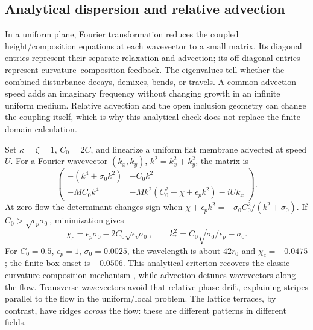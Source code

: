 \subsection{Analytical dispersion and relative advection}


In a uniform plane, Fourier transformation reduces the coupled height/composition equations at each wavevector to a small matrix. Its diagonal entries represent their separate relaxation and advection; its off-diagonal entries represent curvature--composition feedback. The eigenvalues tell whether the combined disturbance decays, demixes, bends, or travels. A common advection speed adds an imaginary frequency without changing growth in an infinite uniform medium. Relative advection and the open inclusion geometry can change the coupling itself, which is why this analytical check does not replace the finite-domain calculation.


Set $\kappa=\zeta=1$, $C_0=2C$, and linearize a uniform flat membrane advected at speed $U$. For a Fourier wavevector $(k_x,k_y)$, $k^2=k_x^2+k_y^2$, the matrix is
\begin{equation}
\begin{pmatrix}
-(k^4+\sigma_0k^2)&-C_0k^2\\
-MC_0k^4&-Mk^2(C_0^2+\chi+\epsilon_pk^2)-iUk_x
\end{pmatrix}.
\end{equation}
At zero flow the determinant changes sign when
$\chi+\epsilon_pk^2=-\sigma_0C_0^2/(k^2+\sigma_0)$. If $C_0>\sqrt{\epsilon_p\sigma_0}$, minimization gives
\begin{equation}
\chi_c=\epsilon_p\sigma_0-2C_0\sqrt{\epsilon_p\sigma_0},\qquad
k_*^2=C_0\sqrt{\sigma_0/\epsilon_p}-\sigma_0.
\end{equation}
For $C_0=0.5$, $\epsilon_p=1$, $\sigma_0=0.0025$, the wavelength is about $42r_0$ and $\chi_c=-0.0475$; the finite-box onset is $-0.0506$. This analytical criterion recovers the classic curvature-composition mechanism \cite{leibler}, while advection detunes wavevectors along the flow. Transverse wavevectors avoid that relative phase drift, explaining stripes parallel to the flow in the uniform/local problem. The lattice terraces, by contrast, have ridges \emph{across} the flow: these are different patterns in different fields.




